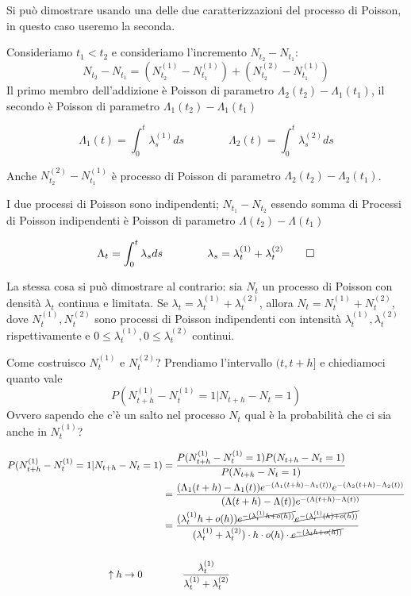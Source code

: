 \documentclass[a4paper,12pt]{book}
\begin{document}
Si può dimostrare usando una delle due caratterizzazioni del processo di Poisson, in questo caso useremo la seconda. 

Consideriamo $ t_1 < t_2 $ e consideriamo l'incremento $ N_{t_2} - N_{t_1} $:
$$ N_{t_2} - N_{t_1} = (N_{t_2}^{(1)} - N_{t_1}^{(1)}) + (N_{t_2}^{(2)} - N_{t_1}^{(1)}) $$
Il primo membro dell'addizione è Poisson di parametro $\Lambda_2(t_2) - \Lambda_1(t_1)$, il secondo è Poisson di parametro $ \Lambda_1(t_2) - \Lambda_1(t_1) $

$$ \Lambda_1(t) = \int_{0}^{t} \lambda_s^{(1)} ds \qquad \qquad \Lambda_2(t) = \int_{0}^{t} \lambda_s^{(2)} ds $$

Anche $ N_{t_2}^{(2)} - N_{t_1}^{(1)} $ è processo di Poisson di parametro $ \Lambda_2(t_2) - \Lambda_2(t_1) $.

I due processi di Poisson sono indipendenti; $ N_{t_1} - N_{t_2} $ essendo somma di Processi di Poisson indipendenti è Poisson di parametro $\Lambda(t_2) - \Lambda(t_1)$

$$ \Lambda_t = \int_{0}^{t} \lambda_s ds \qquad \qquad \lambda_s = \lambda_t^{(1)} + \lambda_t^{(2)} \qed$$

La stessa cosa si può dimostrare al contrario: sia $ N_t $ un processo di Poisson con densità $\lambda_{t}$ continua e limitata. Se $\lambda_{t} = \lambda_t^{(1)} + \lambda_t^{(2)}$, allora $ N_t = N_t^{(1)} + N_t^{(2)} $, dove $ N_t^{(1)}, N_t^{(2)} $ sono processi di Poisson indipendenti con intensità $\lambda_t^{(1)}, \lambda_t^{(2)}$ rispettivamente e $ 0 \le \lambda_t^{(1)}, 0 \le \lambda_t^{(2)} $ continui. 

Come costruisco $ N_t^{(1)} $ e $ N_t^{(2)} $? Prendiamo l'intervallo $ (t, t+h] $ e chiediamoci quanto vale 
$$ P(N_{t+h}^{(1)} - N_t^{(1)} = 1 | N_{t+h} - N_t = 1)  $$
Ovvero sapendo che c'è un salto nel processo $ N_t $ qual è la probabilità che ci sia anche in $ N_t^{(1)} $?

\begin{align*}
	P(N_{t+h}^{(1)} - N_t^{(1)} = 1| N_{t+h} - N_t = 1) & = \frac{P(N_{t+h}^{(1)} - N_t^{(1)}= 1) P(N_{t+h} - N_t = 1)}{P(N_{t+h} - N_t = 1)} \\
	& = \frac{(\Lambda_1(t+h) - \Lambda_1(t))e^{-(\Lambda_{1}(t+h) - \Lambda_1(t))}e^{-(\Lambda_2(t+h) - \Lambda_2(t))} }{(\Lambda(t+h) - \Lambda(t)) e^{-(\Lambda(t+h) - \Lambda(t))}} \\
	& = \frac{(\lambda_t^{(1)} h + o(h)) \cancel{e^{-(\lambda_t^{(1)}h + o(h))}} \cancel{e^{-(\lambda_t^{(1)}(h) +o(h))}} }{ (\lambda_t^{(1)} + \lambda_t^{(2)} ) \cdot h \cdot o(h) \cdot \cancel{ e^{-(\lambda_t h + o(h))} } }
	\\
	\\
	\uparrow h \to 0 \qquad  & \qquad \frac{\lambda_t^{(1)}}{\lambda_t^{(1)} + \lambda_t^{(2)}}
\end{align*}
\end{document}
